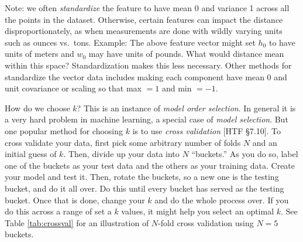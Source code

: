\documentclass[a4paper]{article}
\begin{document}
Note: we often \emph{standardize} the feature to have mean 0 and variance 1 across all the points in the dataset.  Otherwise, certain features can impact the distance disproportionately, as when measurements are done with wildly varying units such as ounces vs.\ tons. Example: The above feature vector might set $h_0$ to have units of meters and $w_0$ may have units of pounds. What would distance mean within this space? Standardization makes this less necessary. Other methods for standardize the vector data includes making each component have mean 0 and unit covariance or scaling so that max $=1$ and min $=-1$. 

How do we choose $k$?  This is an instance of \emph{model order selection}.  In general it is a very hard problem in machine learning, a special case of \emph{model selection}.  But one popular method for choosing $k$ is to use \emph{cross validation} [HTF \S 7.10].
To cross validate your data, first pick some arbitrary number of folds $N$ and an initial guess of $k$. 
Then, divide up your data into $N$ ``buckets.'' As you do so, label one of the buckets as your test data and the others as your training data. Create your model and test it. Then, rotate the buckets, so a new one is the testing bucket, and do it all over. Do this until every bucket has served as the testing bucket. Once that is done, change your $k$ and do the whole process over. If you do this across a range of set a $k$ values, it might help you select an optimal $k$. See Table \ref{tab:crossval} for an illustration of $N$-fold cross validation using $N=5$ buckets.
\end{document}
